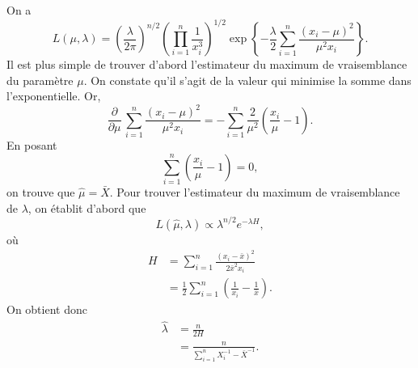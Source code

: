 \begin{solution}{4.11}
    On a
    \begin{equation*}
      L(\mu ,\lambda) =
      \left(
        \frac{\lambda}{2\pi}
      \right)^{n/2}
      \left(
        \prod_{i = 1}^n \frac{1}{x_i^3}
      \right)^{1/2}
      \exp\left\{
        -\frac{\lambda}{2}
        \sum_{i=1}^n \frac{(x_i - \mu)^2}{\mu^2 x_i}
      \right\}.
    \end{equation*}
    Il est plus simple de trouver d'abord l'estimateur du maximum de
    vraisemblance du paramètre $\mu$. On constate qu'il s'agit de la
    valeur qui minimise la somme dans l'exponentielle. Or,
    \begin{equation*}
      \frac{\partial}{\partial \mu}\,
      \sum_{i=1}^n \frac{(x_i - \mu)^2}{\mu^2 x_i} =
      -\sum_{i=1}^n \frac{2}{\mu^2}
      \left( \frac{x_i}{\mu} - 1 \right).
    \end{equation*}
    En posant
    \begin{equation*}
      \sum_{i=1}^n \left( \frac{x_i}{\mu} - 1 \right) = 0,
    \end{equation*}
    on trouve que $\hat{\mu} = \bar{X}$. Pour trouver l'estimateur du
    maximum de vraisemblance de $\lambda$, on établit d'abord que
    \begin{displaymath}
      L(\hat{\mu}, \lambda) \propto \lambda^{n/2} e^{-\lambda H},
    \end{displaymath}
    où
    \begin{align*}
      H &= \sum_{i = 1}^n \frac{(x_i - \bar{x})^2}{2 \bar{x}^2 x_i} \\
      &= \frac{1}{2} \sum_{i = 1}^n
      \left(
        \frac{1}{x_i} - \frac{1}{\bar{x}}
      \right).
    \end{align*}
    On obtient donc
    \begin{align*}
      \hat{\lambda} &= \frac{n}{2H}\\
      &= \frac{n}{\sum_{i = 1}^n X_i^{-1} - \bar{X}^{-1}}.
    \end{align*}
  
\end{solution}
